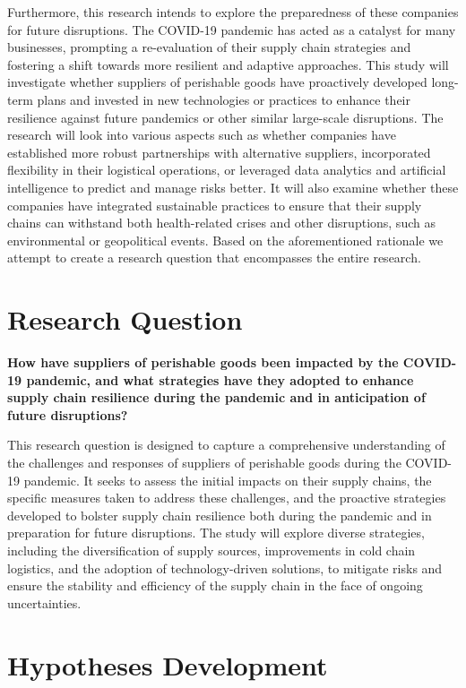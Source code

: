 Furthermore, this research intends to explore the preparedness of these companies for future disruptions. The COVID-19 pandemic has acted as a catalyst for many businesses, prompting a re-evaluation of their supply chain strategies and fostering a shift towards more resilient and adaptive approaches. This study will investigate whether suppliers of perishable goods have proactively developed long-term plans and invested in new technologies or practices to enhance their resilience against future pandemics or other similar large-scale disruptions. The research will look into various aspects such as whether companies have established more robust partnerships with alternative suppliers, incorporated flexibility in their logistical operations, or leveraged data analytics and artificial intelligence to predict and manage risks better. It will also examine whether these companies have integrated sustainable practices to ensure that their supply chains can withstand both health-related crises and other disruptions, such as environmental or geopolitical events. Based on the aforementioned rationale we attempt to create a research question that encompasses the entire research.


\section{Research Question}

\textbf{How have suppliers of perishable goods been impacted by the COVID-19 pandemic, and what strategies have they adopted to enhance supply chain resilience during the pandemic and in anticipation of future disruptions?}

This research question is designed to capture a comprehensive understanding of the challenges and responses of suppliers of perishable goods during the COVID-19 pandemic. It seeks to assess the initial impacts on their supply chains, the specific measures taken to address these challenges, and the proactive strategies developed to bolster supply chain resilience both during the pandemic and in preparation for future disruptions. The study will explore diverse strategies, including the diversification of supply sources, improvements in cold chain logistics, and the adoption of technology-driven solutions, to mitigate risks and ensure the stability and efficiency of the supply chain in the face of ongoing uncertainties.


\section{Hypotheses Development}

